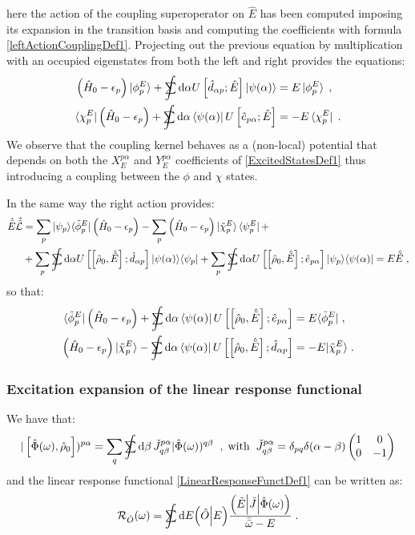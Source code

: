 \documentclass[a4paper]{article}
\newcommand{\dd}{{\rm d}}
\newcommand{\eps}{\epsilon}
\newcommand{\bomega}{\bar\omega}
\newcommand{\bbomega}{\bar{\bomega}}
\newcommand{\sint}{\mathrlap{\displaystyle\int}
\mathrlap{\textstyle\sum}
\phantom{\mathrlap{\displaystyle
\int}\textstyle\sum}}
\newcommand{\be}{\begin{equation}}
\newcommand{\ee}{\end{equation}}
\newcommand{\nn}{\notag}
\newcommand{\lb}{\label}
\newcommand{\mat}[1]{\begin{pmatrix} #1\end{pmatrix}}
\newcommand{\op}[1]{\hat {#1}}
\newcommand{\sop}[1]{\op{\op {#1}}}
\newcommand{\commutator}[2]{\left[ {#1} , {#2} \right]}
\newcommand{\optr}[1]{\check #1}
\newcommand{\tket}[1]{| \tilde #1 \rangle}
\newcommand{\tbra}[1]{\langle \tilde #1 |}
\newcommand{\ketbra}[2]{| #1 \rangle \langle #2 |}
\newcommand{\tketbra}[2]{| #1 \rangle \langle \tilde #2 |}
\newcommand{\sket}[2]{| #2)^{#1}}
\newcommand{\dket}[1]{\Bigl| #1 \Bigr)}
\newcommand{\dbra}[1]{\Bigl(#1 \Bigr|}
\newcommand{\dbraket}[2]{\Bigl(#1 \Bigl| #2 \Bigr)}
\newcommand{\dmnot}{\op{\rho}_0}
\newcommand{\hnot}{\op{H}_0}
\newcommand{\excite}[2]{\op e_{{#1}{#2}}}
\newcommand{\decay}[2]{\op d_{{#1}{#2}}}
\newcommand{\Liouv}{\sop{\mathcal L}}
\begin{document}
here the action of the coupling superoperator on $\op E$ has been computed imposing its expansion in the transition basis and computing the coefficients with formula 
\eqref{leftActionCouplingDef1}. Projecting out the previous equation by multiplication with an occupied eigenstates from both the left and right provides the equations:
\begin{align}\lb{PhipChipEqDef1}
\left(\hnot-\eps_p\right)\ket{\phi^E_p} +\sint \dd\alpha  U\left[\decay{\alpha}{p}; \op E\right] \ket{\psi(\alpha)} &= E\ket{\phi^E_p} \;,\nn \\
\bra{\chi^E_p}\left(\hnot-\eps_p\right) +\sint \dd\alpha \bra{\psi(\alpha)} U\left[\excite{p}{\alpha}; \op E\right] &= -E\bra{\chi^E_p} \;.
\end{align}
We observe that the coupling kernel behaves as a (non-local) potential that depends on both the $X_{E}^{p \alpha}$ and $Y_{E}^{p \alpha}$ coefficients of \eqref{ExcitedStatesDef1}
thus introducing a coupling between the $\phi$ and $\chi$ states. 

In the same way the right action provides:
\begin{align}
\op{\tilde E}\Liouv &= \sum_p\tketbra{\psi_p}{\phi^E_p}\left(\hnot-\eps_p\right) - \sum_p\left(\hnot-\eps_p\right)\tket{\chi^E_p}\bra{\psi^E_p} + \nn \\
&+ \sum_p \sint \dd\alpha  U\left[\commutator{\dmnot}{\op{\tilde E}};\decay{\alpha}{p}\right] \ketbra{\psi(\alpha)}{\psi_p}
+ \sum_p \sint \dd\alpha U\left[\commutator{\dmnot}{\op{\tilde E}};\excite{p}{\alpha}\right] \ketbra{\psi_p}{\psi(\alpha)} = E\op{\tilde E} \;, \nn
\end{align}
so that:
\begin{align}\lb{TildePhipChipEqDef1}
\tbra{\phi^E_p}\left(\hnot-\eps_p\right) +\sint \dd\alpha \bra{\psi(\alpha)} U\left[\commutator{\dmnot}{\op{\tilde E}};\excite{p}{\alpha}\right]  &= E\tbra{\phi^E_p} \;,\nn \\
\left(\hnot-\eps_p\right)\tket{\chi^E_p} -\sint \dd\alpha \bra{\psi(\alpha)} U\left[\commutator{\dmnot}{\op{\tilde E}};\decay{\alpha}{p}\right] &= -E\tket{\chi^E_p} \;.
\end{align}


\subsubsection{Excitation expansion of the linear response functional}

We have that:
\be
\sket{p\alpha}{\commutator{\op\Phi(\omega)}{\dmnot}} = \sum_q\sint\dd\beta\, \optr{J}^{p\alpha}_{q\beta}
\sket{q\beta}{\op\Phi(\omega)} \;\;, \;{\rm with} \;\;
\optr{J}^{p\alpha}_{q\beta} = \delta_{pq}\delta(\alpha-\beta)\mat{1 & 0 \\ 0 & -1}
\ee
and the linear response functional \eqref{LinearResponseFunctDef1} can be written as:
\be
{\cal R}_{\op O}(\omega) = 
\sint\dd E \dbraket{\op O}{E}
\frac{\dbra{\tilde E}\optr{J}\dket{\op\Phi(\omega)}}{\bbomega-E} \;.
\ee
\end{document}
